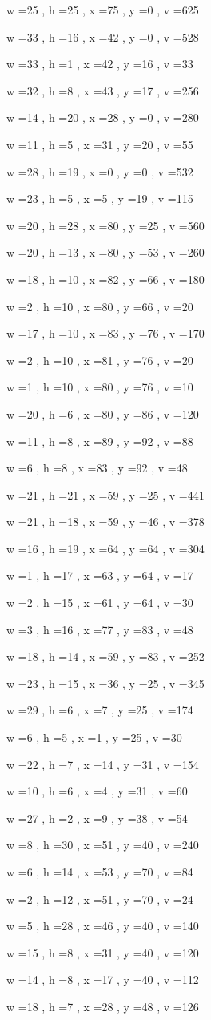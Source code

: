 \documentclass[11pt]{article}
\begin{document}
w =25 , h =25 , x =75 , y =0 , v =625
\par
w =33 , h =16 , x =42 , y =0 , v =528
\par
w =33 , h =1 , x =42 , y =16 , v =33
\par
w =32 , h =8 , x =43 , y =17 , v =256
\par
w =14 , h =20 , x =28 , y =0 , v =280
\par
w =11 , h =5 , x =31 , y =20 , v =55
\par
w =28 , h =19 , x =0 , y =0 , v =532
\par
w =23 , h =5 , x =5 , y =19 , v =115
\par
w =20 , h =28 , x =80 , y =25 , v =560
\par
w =20 , h =13 , x =80 , y =53 , v =260
\par
w =18 , h =10 , x =82 , y =66 , v =180
\par
w =2 , h =10 , x =80 , y =66 , v =20
\par
w =17 , h =10 , x =83 , y =76 , v =170
\par
w =2 , h =10 , x =81 , y =76 , v =20
\par
w =1 , h =10 , x =80 , y =76 , v =10
\par
w =20 , h =6 , x =80 , y =86 , v =120
\par
w =11 , h =8 , x =89 , y =92 , v =88
\par
w =6 , h =8 , x =83 , y =92 , v =48
\par
w =21 , h =21 , x =59 , y =25 , v =441
\par
w =21 , h =18 , x =59 , y =46 , v =378
\par
w =16 , h =19 , x =64 , y =64 , v =304
\par
w =1 , h =17 , x =63 , y =64 , v =17
\par
w =2 , h =15 , x =61 , y =64 , v =30
\par
w =3 , h =16 , x =77 , y =83 , v =48
\par
w =18 , h =14 , x =59 , y =83 , v =252
\par
w =23 , h =15 , x =36 , y =25 , v =345
\par
w =29 , h =6 , x =7 , y =25 , v =174
\par
w =6 , h =5 , x =1 , y =25 , v =30
\par
w =22 , h =7 , x =14 , y =31 , v =154
\par
w =10 , h =6 , x =4 , y =31 , v =60
\par
w =27 , h =2 , x =9 , y =38 , v =54
\par
w =8 , h =30 , x =51 , y =40 , v =240
\par
w =6 , h =14 , x =53 , y =70 , v =84
\par
w =2 , h =12 , x =51 , y =70 , v =24
\par
w =5 , h =28 , x =46 , y =40 , v =140
\par
w =15 , h =8 , x =31 , y =40 , v =120
\par
w =14 , h =8 , x =17 , y =40 , v =112
\par
w =18 , h =7 , x =28 , y =48 , v =126
\par
\newpage
\end{document}
